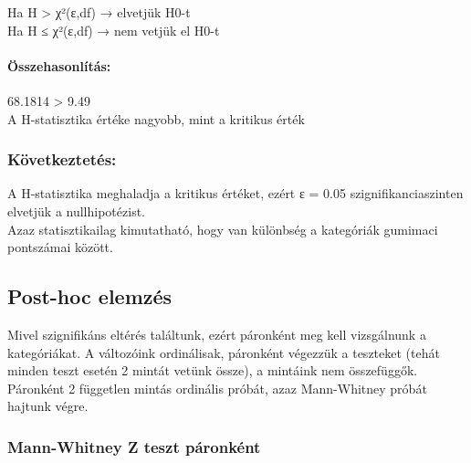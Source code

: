 \documentclass[11pt]{article}
\begin{document}
Ha H \textgreater{} χ²(ε,df) → elvetjük H0-t\\
Ha H ≤ χ²(ε,df) → nem vetjük el H0-t

\paragraph{Összehasonlítás:}\label{uxf6sszehasonluxedtuxe1s}

68.1814 \textgreater{} 9.49\\
A H-statisztika értéke nagyobb, mint a kritikus érték

\subsubsection{Következtetés:}\label{kuxf6vetkeztetuxe9s}

A H-statisztika meghaladja a kritikus értéket, ezért ε = 0.05
szignifikanciaszinten elvetjük a nullhipotézist.\\
Azaz statisztikailag kimutatható, hogy van különbség a kategóriák
gumimaci pontszámai között.

    \subsection{Post-hoc elemzés}\label{post-hoc-elemzuxe9s}

Mivel szignifikáns eltérés találtunk, ezért páronként meg kell
vizsgálnunk a kategóriákat. A változóink ordinálisak, páronként végezzük
a teszteket (tehát minden teszt esetén 2 mintát vetünk össze), a
mintáink nem összefüggők.\\
Páronként 2 független mintás ordinális próbát, azaz Mann-Whitney próbát
hajtunk végre.

\subsubsection{Mann-Whitney Z teszt
páronként}\label{mann-whitney-z-teszt-puxe1ronkuxe9nt}
\end{document}
